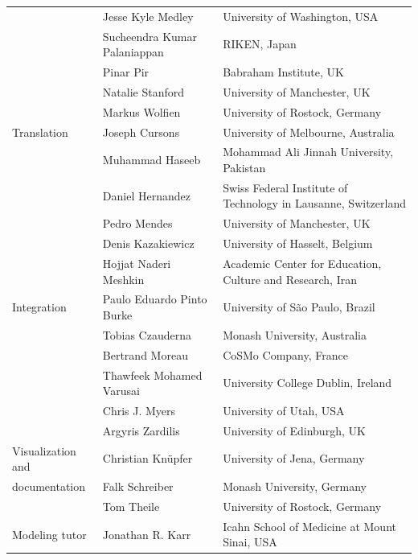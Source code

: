 \documentclass[journal,transmag]{IEEEtran}
\begin{document}
\begin{table}[ht!]
\begin{tabularx}{\textwidth}{l||l||X}
                       & Jesse Kyle Medley                & University of Washington, USA\\
                       & Sucheendra Kumar Palaniappan     & RIKEN, Japan\\
                       & Pinar Pir                        & Babraham Institute, UK\\
                       & Natalie Stanford                 & University of Manchester, UK\\
                       & Markus Wolfien                   & University of Rostock, Germany\\\hline
Translation            & Joseph Cursons                   & University of Melbourne, Australia\\
                       & Muhammad Haseeb                  & Mohammad Ali Jinnah University, Pakistan\\
                       & Daniel Hernandez                 & Swiss Federal Institute of Technology in Lausanne, Switzerland\\
                       & Pedro Mendes                     & University of Manchester, UK\\
                       & Denis Kazakiewicz                & University of Hasselt, Belgium\\
                       & Hojjat Naderi Meshkin            & Academic Center for Education, Culture and Research, Iran\\\hline
Integration            & Paulo Eduardo Pinto Burke        & University of S\~{a}o Paulo, Brazil\\
                       & Tobias Czauderna                 & Monash University, Australia\\
                       & Bertrand Moreau                  & CoSMo Company, France\\
                       & Thawfeek Mohamed Varusai         & University College Dublin, Ireland\\
                       & Chris J. Myers                   & University of Utah, USA\\
                       & Argyris Zardilis                 & University of Edinburgh, UK\\\hline
Visualization and      & Christian Kn\"upfer              & University of Jena, Germany\\
documentation          & Falk Schreiber                   & Monash University, Germany\\
                       & Tom Theile                       & University of Rostock, Germany\\\hline
Modeling tutor         & Jonathan R. Karr                 & Icahn School of Medicine at Mount Sinai, USA\\\hline
\end{tabularx}
\end{table}
\end{document}
